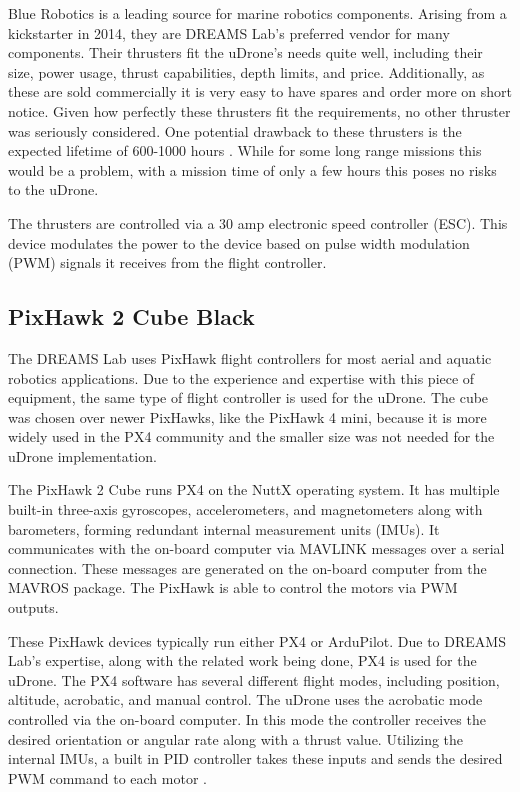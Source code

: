 Blue Robotics is a leading source for marine robotics components. Arising from a kickstarter in 2014, they are DREAMS Lab’s preferred vendor for many components. Their thrusters fit the uDrone’s needs quite well, including their size, power usage, thrust capabilities, depth limits, and price. Additionally, as these are sold commercially it is very easy to have spares and order more on short notice. Given how perfectly these thrusters fit the requirements, no other thruster was seriously considered. One potential drawback to these thrusters is the expected lifetime of 600-1000 hours \parencite{t200}. While for some long range missions this would be a problem, with a mission time of only a few hours this poses no risks to the uDrone. 

The thrusters are controlled via a 30 amp electronic speed controller (ESC). This device modulates the power to the device based on pulse width modulation (PWM) signals it receives from the flight controller. 

\subsection{PixHawk 2 Cube Black}


The DREAMS Lab uses PixHawk flight controllers for most aerial and aquatic robotics applications. Due to the experience and expertise with this piece of equipment, the same type of flight controller is used for the uDrone. The cube was chosen over newer PixHawks, like the PixHawk 4 mini, because it is more widely used in the PX4 community and the smaller size was not needed for the uDrone implementation.

The PixHawk 2 Cube runs PX4 on the NuttX operating system. It has multiple built-in three-axis gyroscopes, accelerometers, and magnetometers along with barometers, forming redundant internal measurement units (IMUs). It communicates with the on-board computer via MAVLINK messages over a serial connection. These messages are generated on the on-board computer from the MAVROS package. The PixHawk is able to control the motors via PWM outputs. 

These PixHawk devices typically run either PX4 or ArduPilot. Due to DREAMS Lab’s expertise, along with the related work being done, PX4 is used for the uDrone. The PX4 software has several different flight modes, including position, altitude, acrobatic, and manual control. The uDrone uses the acrobatic mode controlled via the on-board computer. In this mode the controller receives the desired orientation or angular rate along with a thrust value. Utilizing the internal IMUs, a built in PID controller takes these inputs and sends the desired PWM command to each motor \parencite{px4_pixhawk}. 

